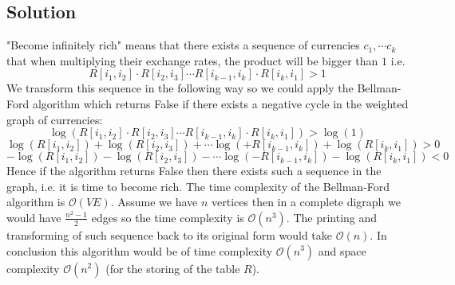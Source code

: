\documentclass[10pt,a4paper]{article}
\begin{document}
\subsection*{Solution}
"Become infinitely rich" means that there exists a sequence of currencies $c_1, \cdots c_k$ that when multiplying their exchange rates, the product will be bigger than $1$ i.e. $$ R[i_1,i_2]\cdot R[i_2,i_3]\cdots R[i_{k-1},i_k]\cdot R[i_k,i_1] > 1 $$  We transform this sequence  in the following way so we could apply the Bellman-Ford algorithm which returns False if there exists a negative cycle in the weighted graph of currencies:
$$ \log (R[i_1,i_2]\cdot R[i_2,i_3]\cdots R[i_{k-1},i_k]\cdot R[i_k,i_1]) > \log(1) $$  
$$ \log(R[i_1,i_2]) + \log( R[i_2,i_3])+ \cdots \log( +R[i_{k-1},i_k]) +\log( R[i_k,i_1]) > 0 $$  
$$ -\log(R[i_1,i_2]) - \log( R[i_2,i_3])- \cdots \log( -R[i_{k-1},i_k]) -\log( R[i_k,i_1]) < 0 $$  
Hence if the algorithm returns False then there exists such a sequence in the graph, i.e. it is time to become rich.
The time complexity of the Bellman-Ford algorithm is $\mathcal{O}(VE)$. Assume we have $n$ vertices then in a complete digraph we would have $\frac {n^2-1} {2}$ edges so the time complexity is $\mathcal{O}(n^3)$. The printing and transforming of such sequence back to its original form would take $\mathcal{O}(n)$. In conclusion this algorithm would be of time complexity $\mathcal{O}(n^3)$ and space complexity $\mathcal{O}(n^2)$ (for the storing of the table $R$).
\end{document}
